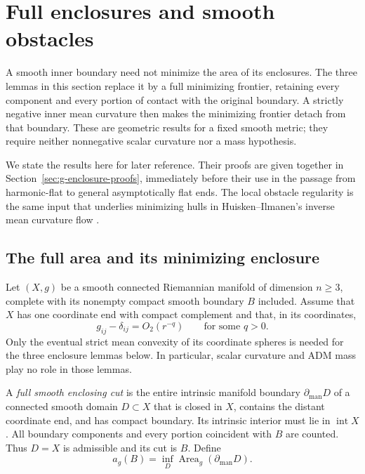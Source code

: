 \section{Full enclosures and smooth obstacles}
\label{sec:g-enclosures}

A smooth inner boundary need not minimize the area of its enclosures.
The three lemmas in this section replace it by a full minimizing
frontier, retaining every component and every portion of contact with
the original boundary. A strictly negative inner mean curvature then
makes the minimizing frontier detach from that boundary. These are
geometric results for a fixed smooth metric; they require neither
nonnegative scalar curvature nor a mass hypothesis.

We state the results here for later reference.
Their proofs are given together in Section~\ref{sec:g-enclosure-proofs},
immediately before their use in the passage from harmonic-flat to
general asymptotically flat ends. The local obstacle regularity is the
same input that underlies minimizing hulls in Huisken--Ilmanen's
inverse mean curvature flow \cite{HuiskenIlmanen2001}.

\subsection{The full area and its minimizing enclosure}

Let $(X,g)$ be a smooth connected Riemannian manifold of
dimension $n\ge3$, complete with its nonempty compact smooth boundary
$B$ included.  Assume that $X$ has one coordinate end with compact
complement and that, in its coordinates,
\begin{equation}
 g_{ij}-\delta_{ij}=O_2(r^{-q})\qquad\text{for some }q>0.
 \label{eq:g-end}
\end{equation}
Only the eventual strict mean convexity of its coordinate spheres is
needed for the three enclosure lemmas below. In particular, scalar
curvature and ADM mass play no role in those lemmas.

A \emph{full smooth enclosing cut} is the entire intrinsic manifold
boundary $\partial_{\mathrm{man}}D$ of a connected smooth domain
$D\subset X$ that is closed in $X$, contains the distant coordinate
end, and has compact boundary.  Its intrinsic interior must lie in
$\operatorname{int}X$.  All boundary components and every portion
coincident with $B$ are counted.  Thus $D=X$ is admissible and its cut
is $B$.  Define
\begin{equation}
 a_g(B)=\inf_D\operatorname{Area}_g(\partial_{\mathrm{man}}D).
 \label{eq:g-full-cut-area}
\end{equation}

